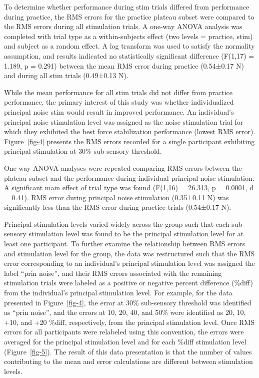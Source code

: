 \documentclass[]{cik}%
\begin{document}
To determine whether performance during stim trials differed from
performance during practice, the RMS errors for the practice plateau
subset were compared to the RMS errors during all stimulation trials. A
one-way ANOVA analysis was completed with trial type as a
within-subjects effect (two levels = practice, stim) and subject as a
random effect. A log transform was used to satisfy the normality
assumption, and results indicated no statistically significant
difference (F(1,17) = 1.189, p = 0.291) between the mean RMS error
during practice (0.54±0.17 N) and during all stim trials (0.49±0.13 N).

While the mean performance for all stim trials did not differ from
practice performance, the primary interest of this study was whether
individualized principal noise stim would result in improved
performance. An individual's principal noise stimulation level was
assigned as the noise stimulation trial for which they exhibited the
best force stabilization performance (lowest RMS error).
Figure~\ref{fig-4} presents the RMS errors recorded for a single
participant exhibiting principal stimulation at 30\% sub-sensory
threshold.

One-way ANOVA analyses were repeated comparing RMS errors between the
plateau subset and the performance during individual principal noise
stimulation. A significant main effect of trial type was found (F(1,16)
= 26.313, p = 0.0001, d = 0.41). RMS error during principal noise
stimulation (0.35±0.11 N) was significantly less than the RMS error
during practice trials (0.54±0.17 N).

Principal stimulation levels varied widely across the group such that
each sub-sensory stimulation level was found to be the principal
stimulation level for at least one participant. To further examine the
relationship between RMS errors and stimulation level for the group, the
data was restructured such that the RMS error corresponding to an
individual's principal stimulation level was assigned the label ``prin
noise'', and their RMS errors associated with the remaining stimulation
trials were labeled as a positive or negative percent difference
(\%diff) from the individual's principal stimulation level. For example,
for the data presented in Figure~\ref{fig-4}, the error at 30\%
sub-sensory threshold was identified as ``prin noise'', and the errors
at 10, 20, 40, and 50\% were identified as 20, 10, +10, and +20 \%diff,
respectively, from the principal stimulation level. Once RMS errors for
all participants were relabeled using this convention, the errors were
averaged for the principal stimulation level and for each \%diff
stimulation level (Figure~\ref{fig-5}). The result of this data
presentation is that the number of values contributing to the mean and
error calculations are different between stimulation levels.
\end{document}
